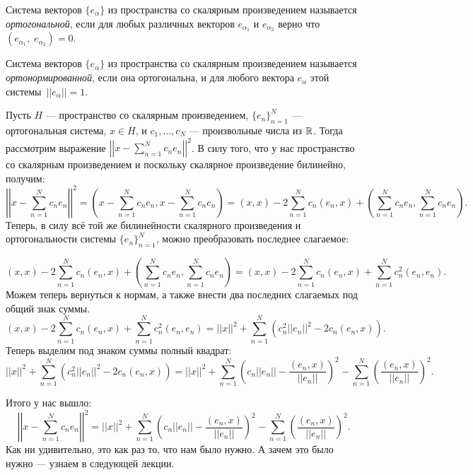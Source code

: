 \begin{Def}
    Система векторов $\{e_\alpha\}$ из пространства со скалярным произведением называется \textit{ортогональной}, если для любых различных векторов $e_{\alpha_1}$ и $e_{\alpha_2}$ верно что $(e_{\alpha_1},\;e_{\alpha_2}) = 0$.
\end{Def}


\begin{Def}
    Система векторов $\{e_\alpha\}$ из пространства со скалярным произведением называется \textit{ортонормированной}, если она ортогональна, и для любого вектора $e_{\alpha}$ этой  системы~$||e_{\alpha}||=1$.
\end{Def}

Пусть $H$ --- пространство со скалярным произведением, $\{e_n\}_{n=1}^{N}$ --- ортогональная система, $x \in H$, и $c_1, \ldots, c_N$ ---  произвольные числа из $\mathbb{R}$. Тогда рассмотрим выражение $\left|\left|x - \sum\limits_{n= 1}^{N}c_ne_n\right|\right|^2$. В силу того, что у нас пространство со скалярным произведением и поскольку скалярное произведение билинейно, получим:
\[
    \left|\left|x - \sum\limits_{n= 1}^{N}c_ne_n\right|\right|^2 = \left(x - \sum\limits_{n= 1}^{N}c_ne_n, x - \sum\limits_{n= 1}^{N}c_ne_n\right) = (x, x) -2 \sum\limits_{n= 1}^{N}c_n(e_n, x) + \left( \sum\limits_{n= 1}^{N}c_ne_n, \sum\limits_{n= 1}^{N}c_ne_n\right).
\]
Теперь, в силу всё той же билинейности скалярного произведения и ортогональности системы $\{e_n\}_{n=1}^{N}$, можно преобразовать последнее слагаемое:

\[
(x, x) -2 \sum\limits_{n= 1}^{N}c_n(e_n, x) + \left( \sum\limits_{n= 1}^{N}c_ne_n, \sum\limits_{n= 1}^{N}c_ne_n\right) = (x, x) - 2 \sum\limits_{n= 1}^{N}c_n(e_n, x) +  \sum\limits_{n= 1}^{N}c_n^2(e_n, e_n).
\]
Можем теперь вернуться к нормам, а также внести два последних слагаемых под общий знак суммы.
\[
(x, x) - 2 \sum\limits_{n= 1}^{N}c_n(e_n, x) +  \sum\limits_{n= 1}^{N}c_n^2(e_n, e_n) = ||x||^2 + \sum\limits_{n= 1}^{N}\left( c_n^2||e_n||^2-2c_n(e_n, x)\right).
\]
Теперь выделим под знаком суммы полный квадрат:
\[
||x||^2 + \sum\limits_{n= 1}^{N}\left( c_n^2||e_n||^2-2c_n(e_n, x)\right) = ||x||^2 + \sum\limits_{n= 1}^{N}\left( c_n||e_n||-\frac{(e_n, x)}{||e_n||}\right)^2 - \sum\limits_{n= 1}^{N}\left(\frac{(e_n, x)}{||e_n||}\right)^2.
\]

Итого у нас вышло:
 $$\left|\left|x - \sum\limits_{n= 1}^{N}c_ne_n\right|\right|^2 = ||x||^2 + \sum\limits_{n= 1}^{N}\left( c_n||e_n||-\frac{(e_n, x)}{||e_n||}\right)^2 - \sum\limits_{n= 1}^{N}\left(\frac{(e_n, x)}{||e_n||}\right)^2.$$
 Как ни удивительно, это как раз то, что нам было нужно. А зачем это было нужно --- узнаем в следующей лекции.